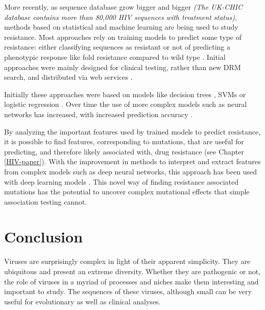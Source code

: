 \documentclass[
  11pt,
  twoside,
  BCOR=10mm,
  listof=totoc]{scrbook}
\begin{document}
More recently, as sequence database grow bigger and bigger \emph{(The UK-CHIC database contains more than 80,000 HIV sequences with treatment status)}, methods based on statistical and machine learning are being used to study resistance. Most approaches rely on training models to predict some type of resistance: either classifying sequences as resistant or not \autocite{blasselUsingMachineLearning2021,steinerDrugResistancePrediction2020a} of predicting a phenotypic response like fold resistance compared to wild type \autocite{sheikamamuddyImprovingFoldResistance2017b}. Initial approaches were mainly designed for clinical testing, rather than new DRM search, and distributed via web services \autocite{beerenwinkelGeno2phenoInterpretingGenotypic2001,riemenschneiderSHIVAWebApplication2016b}.

Initially these approaches were based on models like decision trees \autocite{beerenwinkelDiversityComplexityHIV12002c}, SVMs \autocite{beerenwinkelGeno2phenoInterpretingGenotypic2001} or logistic regression \autocite{heiderMultilabelClassificationExploiting2013b}. Over time the use of more complex models such as neural networks has increased, with increased prediction accuracy \autocite{sheikamamuddyImprovingFoldResistance2017b}.

By analyzing the important features used by trained models to predict resistance, it is possible to find features, corresponding to mutations, that are useful for predicting, and therefore likely associated with, drug resistance (see Chapter \ref{HIV-paper}). With the improvement in methods to interpret and extract features from complex models such as deep neural networks, this approach has been used with deep learning models \autocite{steinerDrugResistancePrediction2020a}. This novel way of finding resistance associated mutations has the potential to uncover complex mutational effects that simple association testing cannot.

\hypertarget{conclusion-3}{%
\section{Conclusion}\label{conclusion-3}}

Viruses are surprisingly complex in light of their apparent simplicity. They are ubiquitous and present an extreme diversity. Whether they are pathogenic or not, the role of viruses in a myriad of processes and niches make them interesting and important to study. The sequences of these viruses, although small can be very useful for evolutionary as well as clinical analyses.
\end{document}
